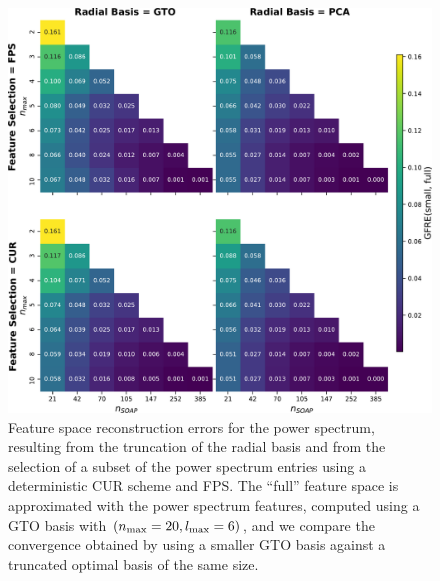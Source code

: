 \begin{figure}[bp]
    \centering
        \includegraphics[width=\linewidth]{fig/optbasis/gfre_scores_paper-silicon-radial_basisGTO-inkscaped.pdf}
    \caption{Feature space reconstruction errors for the power spectrum, resulting from the truncation of the radial basis and from the selection of a subset of the power spectrum entries using a deterministic CUR scheme and FPS. The ``full'' feature space is approximated with the power spectrum features, computed using a GTO basis with $(n_\mathrm{max}= 20, l_\mathrm{max}=6)$, and we compare the convergence obtained by using a smaller GTO basis against a truncated optimal basis of the same size.}
    \label{fig:silicon-soap-gfre}
\end{figure}

